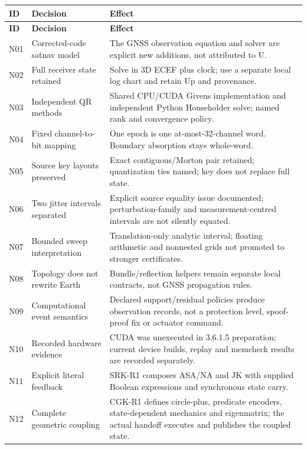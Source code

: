 \documentclass[11pt,a4paper]{article}
\begin{document}
\begin{longtable}{@{}P{.075\textwidth}P{.28\textwidth}P{.575\textwidth}@{}}\toprule
\textbf{ID} & \textbf{Decision} & \textbf{Effect}\\\midrule
\endfirsthead
\toprule\textbf{ID} & \textbf{Decision} & \textbf{Effect}\\\midrule\endhead
N01 & Corrected-code satnav model & The GNSS observation equation and solver are explicit new additions, not attributed to U.\\
N02 & Full receiver state retained & Solve in 3D ECEF plus clock; use a separate local log chart and retain Up and provenance.\\
N03 & Independent QR methods & Shared CPU/CUDA Givens implementation and independent Python Householder solve; named rank and convergence policy.\\
N04 & Fixed channel-to-bit mapping & One epoch is one at-most-32-channel word. Boundary absorption stays whole-word.\\
N05 & Source key layouts preserved & Exact contiguous/Morton pair retained; quantization ties named; key does not replace full state.\\
N06 & Two jitter intervals separated & Explicit source equality issue documented; perturbation-family and measurement-centred intervals are not silently equated.\\
N07 & Bounded sweep interpretation & Translation-only analytic interval; floating arithmetic and nonnested grids not promoted to stronger certificates.\\
N08 & Topology does not rewrite Earth & Bundle/reflection helpers remain separate local contracts, not GNSS propagation rules.\\
N09 & Computational event semantics & Declared support/residual policies produce observation records, not a protection level, spoof-proof fix or actuator command.\\
N10 & Recorded hardware evidence & CUDA was unexecuted in 3.6.1.5 preparation; current device builds, replay and memcheck results are recorded separately.\\
N11 & Explicit literal feedback & SRK-R1 composes ASA/NA and JK with supplied Boolean expressions and synchronous state carry.\\
N12 & Complete geometric coupling & CGK-R1 defines circle-plus, predicate encoders, state-dependent mechanics and eigenmatrix; the actual handoff executes and publishes the coupled state.\\\bottomrule
\end{longtable}
\normalsize
\end{document}

